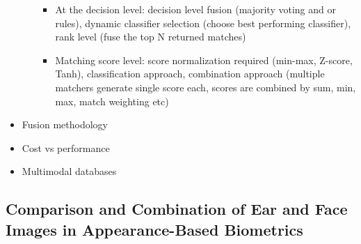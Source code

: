 \documentclass[paper=a4, fontsize=11pt]{scrartcl} %
\numberwithin{equation}{section} %
\numberwithin{figure}{section} %
\numberwithin{table}{section} %
\begin{document}
\begin{itemize}
\begin{itemize}
\begin{itemize}
\item At the decision level: decision level fusion (majority voting and or rules), dynamic classifier selection (choose best performing classifier), rank level (fuse the top N returned matches)
\item Matching score level: score normalization required (min-max, Z-score, Tanh), classification approach, combination approach (multiple matchers generate single score each, scores are combined by sum, min, max, match weighting etc)
\end{itemize}
\end{itemize}
\item Fusion methodology
\item Cost vs performance
\item Multimodal databases
\end{itemize}

\subsection{Comparison and Combination of Ear and Face Images in Appearance-Based Biometrics}
\end{document}
